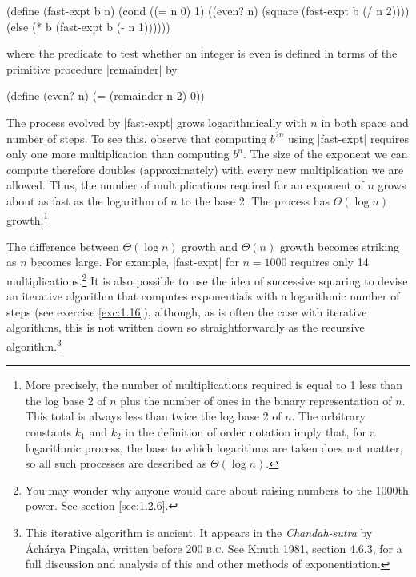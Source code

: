 \begin{schemedisplay}
(define (fast-expt b n)
  (cond ((= n 0) 1)
        ((even? n) (square (fast-expt b (/ n 2))))
        (else (* b (fast-expt b (- n 1))))))
\end{schemedisplay}
where the predicate to test whether an integer is even is defined in terms of
the primitive procedure \scheme|remainder| by

\begin{schemedisplay}
(define (even? n)
  (= (remainder n 2) 0))
\end{schemedisplay}
The process evolved by \scheme|fast-expt| grows logarithmically with
$n$ in both space and number of steps.  To see this, observe that
computing $b^{2n}$ using \scheme|fast-expt| requires only one more
multiplication than computing $b^n$.  The size of the exponent we can
compute therefore doubles (approximately) with every new
multiplication we are allowed.  Thus, the number of multiplications
required for an exponent of $n$ grows about as fast as the logarithm
of $n$ to the base 2.  The process has $\Theta(\log n)$
growth.\footnote{More precisely, the number of multiplications
  required is equal to 1 less than the log base 2 of $n$ plus the
  number of ones in the binary representation of $n$.  This total is
  always less than twice the log base 2 of $n$.  The arbitrary
  constants $k_1$ and $k_2$ in the definition of order notation imply
  that, for a logarithmic process, the base to which logarithms are
  taken does not matter, so all such processes are described as
  $\Theta(\log n)$.}

The difference between $\Theta(\log n)$ growth and $\Theta(n)$ growth
becomes striking as $n$ becomes large.  For example,
\scheme|fast-expt| for $n = 1000$ requires only 14
multiplications.\footnote{You may wonder why anyone would care about
  raising numbers to the 1000th power.  See section \ref{sec:1.2.6}.}
It is also possible to use the idea of successive squaring to devise
an iterative algorithm that computes exponentials with a logarithmic
number of steps (see exercise \ref{exc:1.16}), although, as is often
the case with iterative algorithms, this is not written down so
straightforwardly as the recursive algorithm.\footnote{This iterative
  algorithm is ancient.  It appears in the \textit{Chandah-sutra} by
  \'Ach\'arya Pingala, written before 200 \textsc{b.c}.  See Knuth
  1981, section 4.6.3, for a full discussion and analysis of this and
  other methods of exponentiation.}



